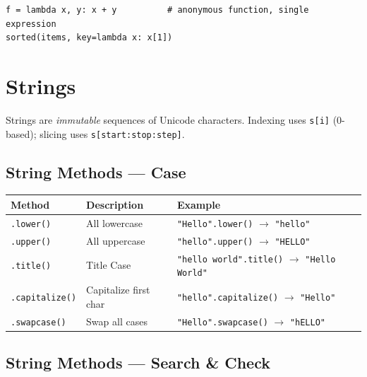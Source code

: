 \documentclass[oneside]{book}
\begin{document}
\begin{codebox}
\begin{lstlisting}
f = lambda x, y: x + y          # anonymous function, single expression
sorted(items, key=lambda x: x[1])
\end{lstlisting}
\end{codebox}

\section{Strings}

Strings are \emph{immutable} sequences of Unicode characters. Indexing uses
\texttt{s[i]} (0-based); slicing uses \texttt{s[start:stop:step]}.

\subsection*{String Methods — Case}

\begin{center}
\begin{tabularx}{\linewidth}{lXl}
\toprule
\textbf{Method} & \textbf{Description} & \textbf{Example} \\
\midrule
\texttt{.lower()}       & All lowercase            & \texttt{"Hello".lower()} $\to$ \texttt{"hello"} \\
\texttt{.upper()}       & All uppercase            & \texttt{"hello".upper()} $\to$ \texttt{"HELLO"} \\
\texttt{.title()}       & Title Case               & \texttt{"hello world".title()} $\to$ \texttt{"Hello World"} \\
\texttt{.capitalize()}  & Capitalize first char    & \texttt{"hello".capitalize()} $\to$ \texttt{"Hello"} \\
\texttt{.swapcase()}    & Swap all cases           & \texttt{"Hello".swapcase()} $\to$ \texttt{"hELLO"} \\
\bottomrule
\end{tabularx}
\end{center}

\subsection*{String Methods — Search \& Check}
\end{document}
